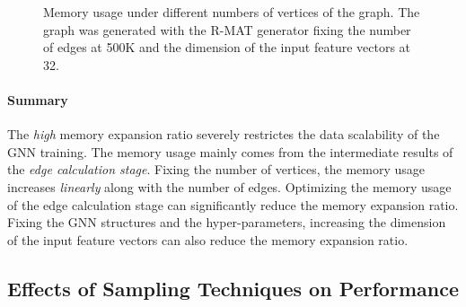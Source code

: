 \begin{figure}[h]
    \centering
    \caption{Memory usage under different numbers of vertices of the graph. The graph was generated with the R-MAT generator fixing the number of edges at 500K and the dimension of the input feature vectors at 32.}
    \label{fig:exp_memory_expansion_ratio_input_graph_number_of_vertices_fixed_edge}
\end{figure}

\paragraph{Summary}
The \emph{high} memory expansion ratio severely restrictes the data scalability of the GNN training.
The memory usage mainly comes from the intermediate results of the \emph{edge calculation stage}.
Fixing the number of vertices, the memory usage increases \emph{linearly} along with the number of edges.
Optimizing the memory usage of the edge calculation stage can significantly reduce the memory expansion ratio.
Fixing the GNN structures and the hyper-parameters, increasing the dimension of the input feature vectors can also reduce the memory expansion ratio.

\subsection{Effects of Sampling Techniques on Performance}
\label{sec:effects_of_sampling_techniques_on_performance}

